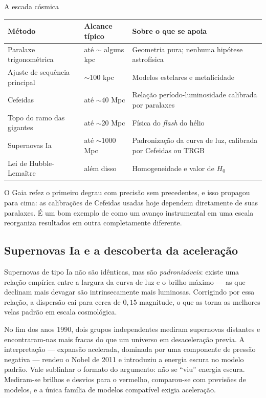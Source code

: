 \documentclass[11pt,a4paper]{article}
\begin{document}
\begin{lessonblock}{A escada cósmica}
\begin{tabular}{>{\raggedright\arraybackslash}p{}>{\raggedright\arraybackslash}p{}>{\raggedright\arraybackslash}p{}}
\toprule
Método & Alcance típico & Sobre o que se apoia \\
\midrule
Paralaxe trigonométrica & até $\sim$ alguns kpc & Geometria pura; nenhuma hipótese astrofísica \\
Ajuste de sequência principal & $\sim$100 kpc & Modelos estelares e metalicidade \\
Cefeidas & até $\sim$40 Mpc & Relação período-luminosidade calibrada por paralaxes \\
Topo do ramo das gigantes & até $\sim$20 Mpc & Física do \textit{flash} do hélio \\
Supernovas Ia & até $\sim$1000 Mpc & Padronização da curva de luz, calibrada por Cefeidas ou TRGB \\
Lei de Hubble-Lemaître & além disso & Homogeneidade e valor de $H_0$ \\
\bottomrule
\end{tabular}
\end{lessonblock}

O Gaia refez o primeiro degrau com precisão sem precedentes, e isso propagou para cima: as calibrações de Cefeidas usadas hoje dependem diretamente de suas paralaxes. É um bom exemplo de como um avanço instrumental em uma escala reorganiza resultados em outra completamente diferente.

\subsection*{Supernovas Ia e a descoberta da aceleração}

Supernovas de tipo Ia não são idênticas, mas são \emph{padronizáveis}: existe uma relação empírica entre a largura da curva de luz e o brilho máximo --- as que declinam mais devagar são intrinsecamente mais luminosas. Corrigindo por essa relação, a dispersão cai para cerca de $0{,}15$ magnitude, o que as torna as melhores velas padrão em escala cosmológica.

No fim dos anos 1990, dois grupos independentes mediram supernovas distantes e encontraram-nas mais fracas do que um universo em desaceleração previa. A interpretação --- expansão acelerada, dominada por uma componente de pressão negativa --- rendeu o Nobel de 2011 e introduziu a energia escura no modelo padrão. Vale sublinhar o formato do argumento: não se ``viu'' energia escura. Mediram-se brilhos e desvios para o vermelho, comparou-se com previsões de modelos, e a única família de modelos compatível exigia aceleração.
\end{document}
